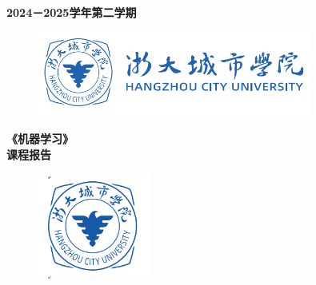 \documentclass{article}
\newcommand{\sizethirty}{\fontsize{30pt}{50pt}}  %
\begin{document}

\pagestyle{empty}
\begin{flushright}
{
     {\simsuntext {} \bfseries 2024－2025学年第二学期}
    
}
\end{flushright}


\begin{figure}[h]
    \centering
    \includegraphics[width=0.8\textwidth]{./城院logo3.png}
\end{figure}
\begin{center}
    {\hwtext\bfseries\sizethirty 
    《机器学习》\\[1.5\baselineskip]  %
    课程报告}
\end{center}
\begin{figure}[h]
    \centering
    \includegraphics[width=0.33\textwidth]{./城院logo2.png}
\end{figure}

\newcommand{\fssi}{\fangsong\zihao{4}}
\end{document}

